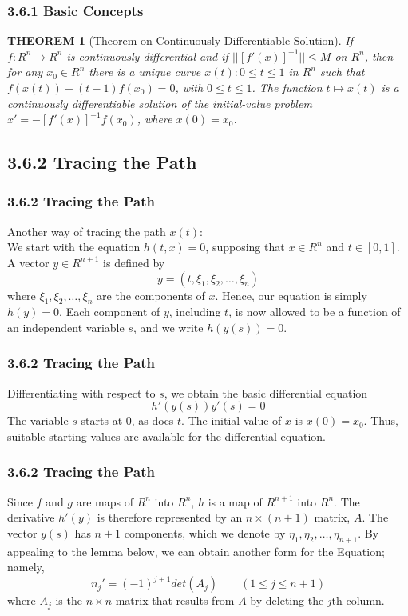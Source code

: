 \documentclass[notheorems,mathserif,table,compress]{beamer}  %
\begin{document}
\begin{frame}
  \frametitle{3.6.1 Basic Concepts}
  \newtheorem{theorem}{THEOREM}
  \begin{theorem}[Theorem on Continuously Differentiable Solution]
  If $f:R^n \to R^n$ is continuously differential and if $||[f'(x)]^{-1}|| \le M$ on $R^n$, then for any $x_0 \in R^n$ there is a unique curve ${x(t):0\le t \le 1}$ in $R^n$ such that $f(x(t))+(t-1)f(x_0)=0$, with $0\le t \le 1$. The function $t\mapsto x(t)$ is a continuously differentiable solution of the initial-value problem $x'=-[f'(x)]^{-1}f(x_0)$, where $x(0)=x_0$.
  \end{theorem}
\end{frame}


\subsection{3.6.2 Tracing the Path}

\begin{frame}
  \frametitle{3.6.2 Tracing the Path}
  Another way of tracing the path $x(t)$:\\
  We start with the equation $h(t,x)=0$, supposing that $x \in R^n$ and $t \in [0,1]$. A vector $y \in R^{n+1}$ is defined by
  \[ y=(t,\xi_1,\xi_2,\ldots,\xi_n) \]
  where $\xi_1,\xi_2,\ldots,\xi_n$ are the components of $x$. Hence, our equation is simply $h(y)=0$. Each component of $y$, including $t$, is now allowed to be a function of an independent variable $s$, and we write $h(y(s))=0$.
\end{frame}


\begin{frame}
  \frametitle{3.6.2 Tracing the Path}
  Differentiating with respect to $s$, we obtain the basic differential equation
  \[ h'(y(s))y'(s)=0 \]
  The variable $s$ starts at 0, as does $t$. The initial value of $x$ is $x(0)=x_0$. Thus, suitable starting values are available for the differential equation.
\end{frame}


\begin{frame}
  \frametitle{3.6.2 Tracing the Path}
  Since $f$ and $g$ are maps of $R^n$ into $R^n$, $h$ is a map of $R^{n+1}$ into $R^n$. The derivative $h'(y)$ is therefore represented by an $n \times (n+1)$ matrix, $A$. The vector $y(s)$ has $n+1$ components, which we denote by $\eta_1,\eta_2,\ldots,\eta_{n+1}$. By appealing to the lemma below, we can obtain another form for the Equation; namely,
  \[ {n_j}'=(-1)^{j+1}det(A_j) \qquad (1\le j\le n+1) \]
  where $A_j$ is the $n \times n$ matrix that results from $A$ by deleting the $j$th column. 
\end{frame}
\end{document}

